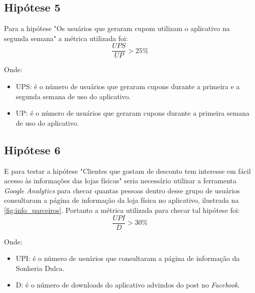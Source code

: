 \subsection{Hipótese 5}
\label{cha:hip_5}
Para a hipótese "Os usuários que geraram cupom utilizam o aplicativo na segunda semana" a métrica utilizada foi:
\[\dfrac{UPS}{UP} > 25\%\]

Onde: 
\begin{itemize}
\item UPS: é o número de usuários que geraram cupons durante a primeira e a segunda semana de uso do aplicativo.
\item UP: é o número de usuários que geraram cupons durante a primeira semana de uso do aplicativo.
\end{itemize}

\subsection{Hipótese 6}
\label{cha:hip_6}
E para testar a hipótese "Clientes que gostam de desconto tem interesse em fácil acesso às informações das lojas físicas" seria necessário utilizar a ferramenta \textit{Google Analytics} para checar quantas pessoas dentro desse grupo de usuários consultaram a página de informação da loja física no aplicativo, ilustrada na \autoref{fig:info_parceiros}. Portanto a métrica utilizada para checar tal hipótese foi:
\[\dfrac{UPI}{D} > 30\%\]

Onde: 
\begin{itemize}
\item UPI: é o número de usuários que consultaram a página de informação da Sonheria Dulca.
\item D: é o número de downloads do aplicativo advindos do post no \textit{Facebook}.
\end{itemize}

